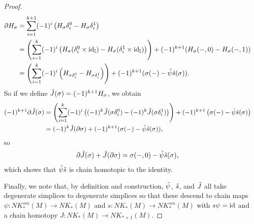 \begin{proof}
\begin{align*}
\partial H_\sigma&=\sum_{i=1}^{k+1} (-1)^i\left(H_\sigma \delta_i^0-H_\sigma \delta^1_i\right)\\
&=\left(\sum_{i=1}^{k} (-1)^i\left(H_\sigma (\delta_i^0\times \mathrm{id}_{\mathbb{I}})-H_\sigma (\delta^1_i\times \mathrm{id}_{\mathbb{I}})\right)\right) +(-1)^{k+1}(H_\sigma(-,0)-H_\sigma(-,1))\\
&=\left(\sum_{i=1}^{k} (-1)^i\left(H_{\sigma \delta_i^0}-H_{\sigma\delta^1_i}\right)\right) +(-1)^{k+1}(\sigma(-)-\tilde \psi\tilde s(\sigma)).
\end{align*}
So if we define $\tilde J(\sigma)=(-1)^{k+1}H_\sigma$, we obtain
\begin{align*}
(-1)^{k+1}\partial \tilde J(\sigma)&=\left(\sum_{i=1}^{k} (-1)^i\left( (-1)^k\tilde J(\sigma \delta_i^0)-(-1)^k\tilde J(\sigma\delta^1_i)\right)\right) +(-1)^{k+1}\left(\sigma(-)-\tilde \psi\tilde s(\sigma)\right)\\
&=(-1)^k\tilde J(\partial \sigma)+(-1)^{k+1}(\sigma(-)-\tilde \psi\tilde s(\sigma)),
\end{align*}
so $$\partial \tilde J(\sigma)+\tilde J(\partial \sigma)=\sigma(-,0)-\tilde \psi\tilde s(\sigma),$$
which shows that $\tilde \psi\tilde s$ is chain homotopic to the identity.

Finally, we note that, by definition and construction, $\tilde \psi$, $\tilde s$, and $\tilde J$ all take degenerate simplices to degenerate simplices so that these descend to chain maps $\psi:NK_*^{sm}(M)\to NK_*(M)$ and $s:NK_*(M)\to NK_*^{sm}(M)$ with $s\psi=\mathrm{id}$ and a chain homotopy $J:NK_*(M)\to NK_{*+1}(M)$.
\end{proof}


